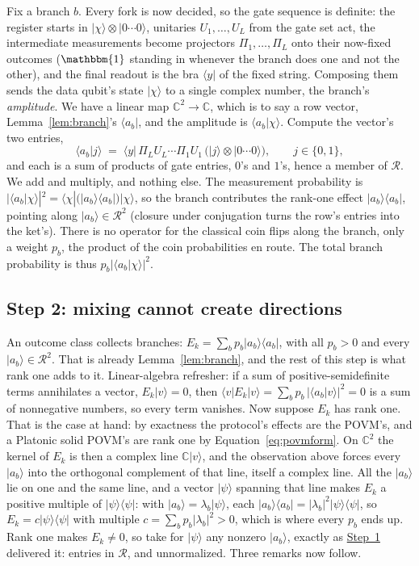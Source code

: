 \documentclass[11pt,a4paper]{article}
\newcommand{\C}{\mathbb{C}}
\newcommand{\Id}{\mathbbm{1}}
\newcommand{\ket}[1]{|#1\rangle}
\newcommand{\bra}[1]{\langle#1|}
\newcommand{\braket}[2]{\langle#1|#2\rangle}
\newcommand{\ketbra}[2]{|#1\rangle\langle#2|}
\begin{document}
Fix a branch $b$. Every fork is now decided, so the gate sequence is definite: the register starts in $\ket{\chi} \otimes \ket{0\cdots 0}$, unitaries $U_1, \dots, U_L$ from the gate set act, the intermediate measurements become projectors $\Pi_1, \dots, \Pi_L$ onto their now-fixed outcomes ($\Id$ standing in whenever the branch does one and not the other), and the final readout is the bra $\bra{y}$ of the fixed string. Composing them sends the data qubit's state $\ket{\chi}$ to a single complex number, the branch's \textit{amplitude}. We have a linear map $\C^2 \to \C$, which is to say a row vector, Lemma~\ref{lem:branch}'s $\bra{a_b}$, and the amplitude is $\braket{a_b}{\chi}$. Compute the vector's two entries,
\begin{equation*}
\braket{a_b}{j} \;=\; \bra{y}\, \Pi_L U_L \cdots \Pi_1 U_1 \,\bigl(\ket{j} \otimes \ket{0\cdots 0}\bigr), \qquad j \in \{0,1\},
\end{equation*}
and each is a sum of products of gate entries, $0$'s and $1$'s, hence a member of $\mathcal{R}$. We add and multiply, and nothing else. The measurement probability is $|\braket{a_b}{\chi}|^2 = \bra{\chi}\bigl(\ketbra{a_b}{a_b}\bigr)\ket{\chi}$, so the branch contributes the rank-one effect $\ketbra{a_b}{a_b}$, pointing along $\ket{a_b} \in \mathcal{R}^2$ (closure under conjugation turns the row's entries into the ket's). There is no operator for the classical coin flips along the branch, only a weight $p_b$, the product of the coin probabilities en route. The total branch probability is thus $p_b|\braket{a_b}{\chi}|^2$.

\subsection{Step 2: mixing cannot create directions} \label{sec:decker:step2}

An outcome class collects branches: $E_k = \sum_b p_b \ketbra{a_b}{a_b}$, with all $p_b > 0$ and every $\ket{a_b} \in \mathcal{R}^2$. That is already Lemma~\ref{lem:branch}, and the rest of this step is what rank one adds to it. Linear-algebra refresher: if a sum of positive-semidefinite terms annihilates a vector, $E_k\ket{v} = 0$, then $\bra{v}E_k\ket{v} = \sum_b p_b\,|\braket{a_b}{v}|^2 = 0$ is a sum of nonnegative numbers, so every term vanishes. Now suppose $E_k$ has rank one. That is the case at hand: by exactness the protocol's effects are the POVM's, and a Platonic solid POVM's are rank one by Equation~\eqref{eq:povmform}. On $\C^2$ the kernel of $E_k$ is then a complex line $\C\ket{v}$, and the observation above forces every $\ket{a_b}$ into the orthogonal complement of that line, itself a complex line. All the $\ket{a_b}$ lie on one and the same line, and a vector $\ket{\psi}$ spanning that line makes $E_k$ a positive multiple of $\ketbra{\psi}{\psi}$: with $\ket{a_b} = \lambda_b\ket{\psi}$, each $\ketbra{a_b}{a_b} = |\lambda_b|^2\ketbra{\psi}{\psi}$, so $E_k = c\ketbra{\psi}{\psi}$ with multiple $c = \sum_b p_b|\lambda_b|^2 > 0$, which is where every $p_b$ ends up. Rank one makes $E_k \neq 0$, so take for $\ket{\psi}$ any nonzero $\ket{a_b}$, exactly as \hyperref[sec:decker:step1]{Step~1} delivered it: entries in $\mathcal{R}$, and unnormalized. Three remarks now follow.
\end{document}
